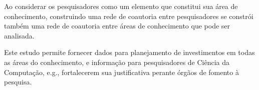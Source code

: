 Ao considerar os pesquisadores como um elemento que constitui sua área de conhecimento, construindo uma rede de coautoria entre pesquisadores se constrói também uma rede de coautoria entre áreas de conhecimento que pode ser analisada.

Este estudo permite fornecer dados para planejamento de investimentos em todas as áreas do conhecimento, e informação para pesquisadores de Ciência da Computação, e.g., fortalecerem sua justificativa perante órgãos de fomento à pesquisa.

